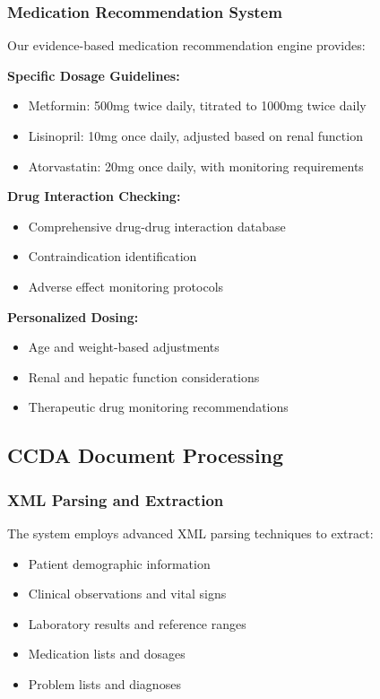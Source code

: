 \documentclass[12pt,a4paper]{article}
\begin{document}
\subsubsection{Medication Recommendation System}

Our evidence-based medication recommendation engine provides:

\textbf{Specific Dosage Guidelines:}
\begin{itemize}
    \item Metformin: 500mg twice daily, titrated to 1000mg twice daily
    \item Lisinopril: 10mg once daily, adjusted based on renal function
    \item Atorvastatin: 20mg once daily, with monitoring requirements
\end{itemize}

\textbf{Drug Interaction Checking:}
\begin{itemize}
    \item Comprehensive drug-drug interaction database
    \item Contraindication identification
    \item Adverse effect monitoring protocols
\end{itemize}

\textbf{Personalized Dosing:}
\begin{itemize}
    \item Age and weight-based adjustments
    \item Renal and hepatic function considerations
    \item Therapeutic drug monitoring recommendations
\end{itemize}

\subsection{CCDA Document Processing}

\subsubsection{XML Parsing and Extraction}

The system employs advanced XML parsing techniques to extract:
\begin{itemize}
    \item Patient demographic information
    \item Clinical observations and vital signs
    \item Laboratory results and reference ranges
    \item Medication lists and dosages
    \item Problem lists and diagnoses
\end{itemize}
\end{document}
